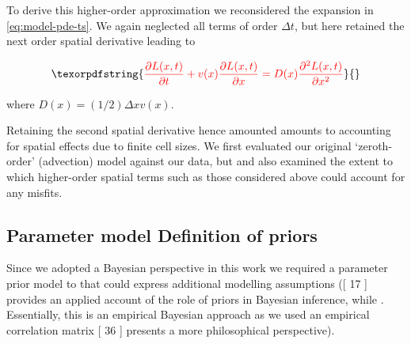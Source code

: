 \documentclass[10pt,letterpaper]{article}
\providecommand{\DIFaddtex}[1]{{\protect\color{blue} \sf #1}} %
\providecommand{\DIFdeltex}[1]{{\protect\color{red} \scriptsize #1}} %
\providecommand{\DIFaddbegin}{} %
\providecommand{\DIFaddend}{} %
\providecommand{\DIFdelbegin}{} %
\providecommand{\DIFdelend}{} %
\providecommand{\DIFadd}[1]{\texorpdfstring{\DIFaddtex{#1}}{#1}} %
\providecommand{\DIFdel}[1]{\texorpdfstring{\DIFdeltex{#1}}{}} %
\begin{document}
\DIFdel{To derive this higher-order approximation we reconsidered the expansion
in \ref{eq:model-pde-ts}. We again neglected all terms of order
\(\Delta t\), but here retained the next order spatial derivative
leading to
}%

\begin{displaymath}\DIFdel{\frac{\partial L(x,t)}{\partial t} + v(x)\frac{\partial L(x,t)}{\partial x} = D(x)\frac{\partial^2 L(x,t)}{\partial x^2}%
}\end{displaymath}

\DIFdel{where \(D(x) = (1/2)\Delta x v(x)\)}\DIFdelend . \DIFdelbegin %

\DIFdelend Retaining the second spatial derivative hence \DIFdelbegin \DIFdel{amounted }\DIFdelend \DIFaddbegin \DIFadd{amounts }\DIFaddend to
accounting for spatial effects due to finite cell sizes. We \DIFdelbegin \DIFdel{first }\DIFdelend evaluated
our original `zeroth-order' (advection) model against our data, \DIFdelbegin \DIFdel{but }\DIFdelend \DIFaddbegin \DIFadd{and }\DIFaddend also
examined the extent to which higher-order spatial terms such as those
considered above could account for any misfits.

\subsection{\DIFdelbegin \DIFdel{Parameter model}\DIFdelend \DIFaddbegin \DIFadd{Definition of priors}\DIFaddend }\DIFdelbegin %
\DIFdelend \DIFaddbegin \label{definition-of-priors}
\DIFaddend 

Since we adopted a Bayesian perspective in this work we required a
parameter prior model \DIFdelbegin \DIFdel{to }\DIFdelend \DIFaddbegin \DIFadd{that could }\DIFaddend express additional modelling
assumptions \DIFdelbegin \DIFdel{(}\DIFdelend {[}\DIFdelbegin \DIFdel{17}\DIFdelend \DIFaddbegin \DIFadd{20}\DIFaddend {]}\DIFdelbegin \DIFdel{provides an applied account of the role of priors in Bayesian
inference, while }\DIFdelend \DIFaddbegin \DIFadd{. Essentially, this is an empirical Bayesian
approach as we used an empirical correlation matrix }\DIFaddend {[}\DIFdelbegin \DIFdel{36}\DIFdelend \DIFaddbegin \DIFadd{50}\DIFaddend {]}\DIFdelbegin \DIFdel{presents a more philosophical perspective)}\DIFdelend .
\end{document}
